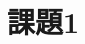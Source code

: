 \documentclass[a4paper,12pt]{jarticle}
\newcommand{\dotgt}{\ooalign{$>$\crcr\hss$\cdot$\hss}}
\newcommand{\dotlt}{\ooalign{$<$\crcr\hss$\cdot$\hss}}
\begin{document}
\section*{課題1}
\begin{comment}
教科書表4.2の演算子順位行列が表す算術式に対して、次の2点の追加を考える。
\begin{enumerate}
 \renewcommand{\labelenumi}{(\arabic{enumi})}
 \item 構造体修飾子.のついた参照が許されるようにする(例えばx.aのような参照)。
 \item 右辺の式の結果を左辺へ代入する演算子$\leftarrow$を追加する。優先順位は例えばx.a*y.bは((x.a)*(y.b))を意味するものとする。
\end{enumerate}
これらを施したものについて、演算順位行列を示せ。
\begin{table}[H]
 \begin{center}
  \caption{教科書表4.2}
  \begin{tabular}{|c|cccccccc|}\hline
	\backslashbox{左}{右}&	$+$&	$-$&	$*$&	$/$&	$($&	$)$&		識別子&	終\\		\hline
	始&			\dotlt&	\dotlt&	\dotlt&	\dotlt&	\dotlt&	&		\dotlt&	$\doteq$\\
	$+$&			\dotgt&	\dotgt&	\dotlt&	\dotlt&	\dotlt&	\dotgt&		\dotlt&	\dotgt\\	
	$-$&			\dotgt&	\dotgt&	\dotlt&	\dotlt&	\dotlt&	\dotgt&		\dotlt&	\dotgt\\	
	$*$&			\dotgt&	\dotgt&	\dotgt&	\dotgt&	\dotlt&	\dotgt&		\dotlt&	\dotgt\\	
	$/$&			\dotgt&	\dotgt&	\dotgt&	\dotgt&	\dotlt&	\dotgt&		\dotlt&	\dotgt\\	
	$($&			\dotlt&	\dotlt&	\dotlt&	\dotlt&	\dotlt&	$\doteq$&	\dotlt&	\\	
	識別子&			\dotgt&	\dotgt&	\dotgt&	\dotgt&	&	\dotgt&		&	\dotgt\\	\hline
  \end{tabular}
 \end{center}
\end{table}
\end{comment}
\end{document}
